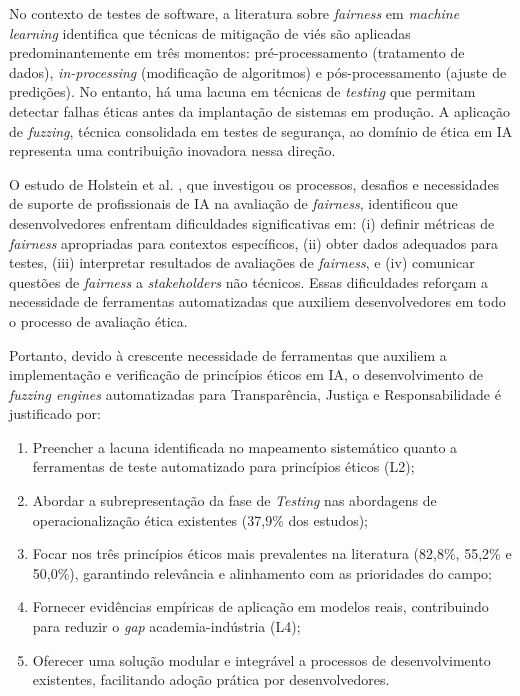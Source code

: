 No contexto de testes de software, a literatura sobre \textit{fairness} em \textit{machine learning} \cite{Caton2024, Pessach2020} identifica que técnicas de mitigação de viés são aplicadas predominantemente em três momentos: pré-processamento (tratamento de dados), \textit{in-processing} (modificação de algoritmos) e pós-processamento (ajuste de predições). No entanto, há uma lacuna em técnicas de \textit{testing} que permitam detectar falhas éticas antes da implantação de sistemas em produção. A aplicação de \textit{fuzzing}, técnica consolidada em testes de segurança, ao domínio de ética em IA representa uma contribuição inovadora nessa direção.

O estudo de Holstein et al. \cite{Holstein2019}, que investigou os processos, desafios e necessidades de suporte de profissionais de IA na avaliação de \textit{fairness}, identificou que desenvolvedores enfrentam dificuldades significativas em: (i) definir métricas de \textit{fairness} apropriadas para contextos específicos, (ii) obter dados adequados para testes, (iii) interpretar resultados de avaliações de \textit{fairness}, e (iv) comunicar questões de \textit{fairness} a \textit{stakeholders} não técnicos. Essas dificuldades reforçam a necessidade de ferramentas automatizadas que auxiliem desenvolvedores em todo o processo de avaliação ética.

Portanto, devido à crescente necessidade de ferramentas que auxiliem a implementação e verificação de princípios éticos em IA, o desenvolvimento de \textit{fuzzing engines} automatizadas para Transparência, Justiça e Responsabilidade é justificado por:

\begin{enumerate}
    \item Preencher a lacuna identificada no mapeamento sistemático quanto a ferramentas de teste automatizado para princípios éticos (L2);
    
    \item Abordar a subrepresentação da fase de \textit{Testing} nas abordagens de operacionalização ética existentes (37,9\% dos estudos);
    
    \item Focar nos três princípios éticos mais prevalentes na literatura (82,8\%, 55,2\% e 50,0\%), garantindo relevância e alinhamento com as prioridades do campo;
    
    \item Fornecer evidências empíricas de aplicação em modelos reais, contribuindo para reduzir o \textit{gap} academia-indústria (L4);
    
    \item Oferecer uma solução modular e integrável a processos de desenvolvimento existentes, facilitando adoção prática por desenvolvedores.
\end{enumerate}

